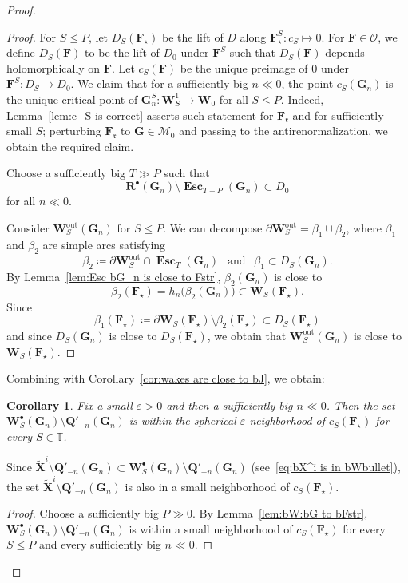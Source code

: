 \documentclass{amsart}
\renewcommand{\sp}{{\ \ }}
\newcommand{\1}{{\mathbb 1 }}
\newcommand\MM{\mathscr{M}}
\newcommand\bMM{{\pmb {\MM}}}
\newcommand\PT{\mathbb{ T}}
\newcommand{\bF}{{\mathbf F}}
\newcommand{\bX}{{\mathbf X}}
\newcommand{\bW}{{\mathbf W}}
\newcommand{\bQ}{{\mathbf Q}}
\newcommand{\bR}{{\mathbf R}}
\newcommand{\bG}{{\mathbf G}}
\newcommand{\str}{{\star}}
\newcommand{\rr}{\mathfrak{r}}
\newcommand\bOO{{ \boldsymbol{\mathcal O}}}
\newcommand\out{{\operatorname{out}}}
\newtheorem{cor}[thm]{Corollary}
\theoremstyle{remark}
\numberwithin{equation}{section}
\theoremstyle{definition}
\newcommand{\Esc}{{\boldsymbol{\operatorname{Esc}}}}
\theoremstyle{nonumberbreak}
\begin{document}
\begin{proof}
\begin{proof}
For $S\le P$, let $D_S(\bF_\str)$ be the lift of $D$ along $\bF_\str^S\colon c_S\mapsto 0$. For $\bF\in \bOO$, we define $D_S(\bF)$ to be the lift of $D_0$ under $\bF^S$ such that  $D_S(\bF)$ depends holomorphically on $\bF$. Let $c_S(\bF)$ be the unique preimage of $0$ under $\bF^S\colon D_S\to D_0$.
We claim that for a sufficiently big $n\ll 0$, the point $c_S(\bG_n)$ is the unique critical point of $\bG^S_n\colon \bW^1_S\to \bW_0$ for all $S\le P$. Indeed, Lemma~\ref{lem:c_S is correct} asserts such statement for $\bF_\rr$ and for sufficiently small $S$; perturbing $\bF_\rr$ to $\bG\in \bMM_0$ and passing to the antirenormalization, we obtain the required claim.









Choose a sufficiently big $T\gg P$ such that \[\bR^\bullet (\bG_n) \setminus  \Esc_{T-P}(\bG_n) \subset D_0\]
for all $n\ll 0$.


Consider $\bW^\out_S(\bG_n)$ for $S\le P$. We can decompose $\partial \bW^\out_S = \beta_1\cup \beta_2$, where $\beta_1$ and $\beta_2$ are simple arcs satisfying \[\beta_2\coloneqq \partial \bW^\out_S\cap \Esc_T(\bG_n) \sp \text{ and }\sp \beta_1\subset D_S(\bG_n).\] By Lemma~\ref{lem:Esc bG_n is close to Fstr}, $\beta_2(\bG_n)$ is close to \[\beta_2(\bF_\str)=h_n \big(\beta_2(\bG_n) \big)\subset \bW_S(\bF_\str).\] Since \[\beta_1(\bF_\str)\coloneqq \partial \bW_S(\bF_\str)\setminus \beta_2(\bF_\str)\subset D_S(\bF_\str) \] and since $D_S(\bG_n)$ is close to $D_S(\bF_\str)$, we obtain that $\bW^\out_S(\bG_n)$ is close to $\bW_S(\bF_\str)$.
\end{proof}

Combining with Corollary~\ref{cor:wakes are close to bJ}, we obtain:
 
\begin{cor}
\label{cor:contr bW'}
Fix a small $\varepsilon>0$ and then a sufficiently big $n\ll 0$. Then the set $  \bW^\bullet_S(\bG_n)\setminus \bQ'_{-n}(\bG_n)$ is within the spherical  $\varepsilon$-neighborhood of $c_S(\bF_\str)$ for every $S\in \PT$. 
\end{cor}
\noindent Since  $\widetilde \bX^{i}\setminus \bQ'_{-n}(\bG_n)\subset  \bW^\bullet_S(\bG_n)\setminus \bQ'_{-n}(\bG_n)$ (see~\eqref{eq:bX^i is in bWbullet}), the set  $\widetilde \bX^{i}\setminus \bQ'_{-n}(\bG_n)$ is also in a small neighborhood of $c_S(\bF_\str)$.
\begin{proof}
Choose a sufficiently big $P\gg0$. By Lemma~\ref{lem:bW:bG to bFstr},  $\bW^\bullet_S(\bG_n)\setminus \bQ'_{-n}(\bG_n)$ is within a small neighborhood of $c_S(\bF_\str)$ for every $S\le P$ and every sufficiently big $n\ll0$. 



\end{proof}
\end{proof}
\end{document}
